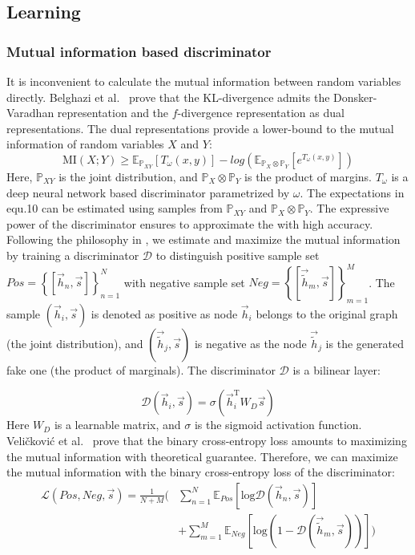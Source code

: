 \documentclass[conference]{IEEEtran}
\begin{document}
\subsection{{\our} Learning}\label{sec:learning}
\subsubsection{Mutual information based discriminator}
It is inconvenient to calculate the mutual information between random variables directly. 
	Belghazi et al.~\cite{BBROBCD18} prove that the KL-divergence admits the Donsker-Varadhan representation and the $f$-divergence representation as dual representations. The dual representations provide a lower-bound to the mutual information of random variables $X$ and $Y$:
\begin{equation}
		\text{MI}(X;Y) \geq \mathbb{E}_{\mathbb{P}_{XY}}[T_{\omega}(x,y)]-log(\mathbb{E}_{\mathbb{P}_{X} \otimes \mathbb{P}_{Y}}[e^{T_{\omega}(x,y)}])
\end{equation}\label{eq:mi}	
Here, $\mathbb{P}_{XY}$ is the joint distribution, and $\mathbb{P}_{X} \otimes \mathbb{P}_{Y}$ is the product of margins. $T_{\omega}$ is a deep neural network based discriminator parametrized by $\omega$. The expectations in equ.10 can be estimated using samples from $\mathbb{P}_{XY}$ and $\mathbb{P}_{X} \otimes \mathbb{P}_{Y}$. The expressive power of the discriminator ensures to approximate the  with high accuracy. 
	Following the philosophy in \cite{HFMGBTB19}, we estimate and maximize the mutual information by training a discriminator $\mathcal{D}$ to distinguish positive sample set $Pos=\left\{[\vec{h}_n, \vec{s}]\right\}_{n=1}^N$ with negative sample set $Neg=\left\{[\vec{\tilde{h}}_m, \vec{s}]\right\}_{m=1}^M$. The sample $(\vec{h}_i, \vec{s})$ is denoted as positive as node $\vec{h}_i$ belongs to the original graph (the joint distribution), and $(\vec{\tilde{h}}_j, \vec{s})$ is negative as the node $\vec{\tilde{h}}_j$ is the generated fake one (the product of marginals). The discriminator $\mathcal{D}$ is a bilinear layer:
	
	
\begin{equation}
		\mathcal{D}(\vec{h}_i, \vec{s}) = \sigma(\vec{h}_i^\mathrm{T}W_D\vec{s})
		\label{eq:discriminator}
\end{equation}	
Here $W_D$ is a learnable matrix, and $\sigma$ is the sigmoid activation function.
	Veli{\v{c}}kovi{\'c} et al.~\cite{velivckovic2018deep} prove that the binary cross-entropy loss amounts to maximizing the mutual information with theoretical guarantee.
Therefore, we can maximize the mutual information with the binary cross-entropy loss of the discriminator:
\begin{align}
		\mathcal{L}(Pos, Neg, \vec{s}) =  \frac{1}{N+M} \Bigg(&\sum_{n=1}^N \mathbb{E}_{Pos}[\mathrm{log} \mathcal{D}(\vec{h}_n, \vec{s})] \nonumber\\
		&+ \sum_{m=1}^M \mathbb{E}_{Neg}[\mathrm{log}(1-\mathcal{D}(\vec{\tilde{h}}_m, \vec{s}))]\Bigg) 
		\label{eq:loss}
	\end{align}		
\end{document}
